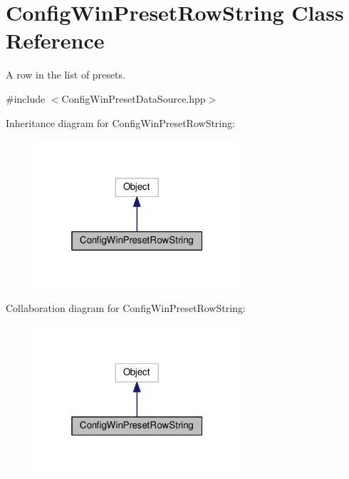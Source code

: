 \hypertarget{classConfigWinPresetRowString}{}\section{Config\+Win\+Preset\+Row\+String Class Reference}
\label{classConfigWinPresetRowString}


A row in the list of presets.  




{\ttfamily \#include $<$Config\+Win\+Preset\+Data\+Source.\+hpp$>$}



Inheritance diagram for Config\+Win\+Preset\+Row\+String\+:
\nopagebreak
\begin{figure}[H]
\begin{center}
\leavevmode
\includegraphics[width=217pt]{classConfigWinPresetRowString__inherit__graph}
\end{center}
\end{figure}


Collaboration diagram for Config\+Win\+Preset\+Row\+String\+:
\nopagebreak
\begin{figure}[H]
\begin{center}
\leavevmode
\includegraphics[width=217pt]{classConfigWinPresetRowString__coll__graph}
\end{center}
\end{figure}
